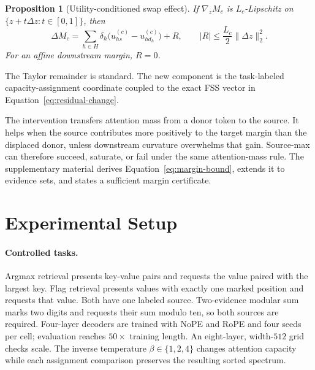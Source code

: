 \documentclass{article}
\newtheorem{proposition}{Proposition}
\begin{document}
\begin{proposition}[Utility-conditioned swap effect]
If $\nabla_z M_c$ is $L_c$-Lipschitz on $\{z+t\Delta z:t\in[0,1]\}$, then
\begin{equation}
 \Delta M_c=
 \sum_{h\in H}\delta_h\big(u_{hs}^{(c)}-u_{hd_h}^{(c)}\big)+R,
 \qquad |R|\le\frac{L_c}{2}\lVert\Delta z\rVert_2^2.
\label{eq:margin-bound}
\end{equation}
For an affine downstream margin, $R=0$.
\label{prop:utility}
\end{proposition}

The Taylor remainder is standard. The new component is the task-labeled capacity-assignment coordinate coupled
to the exact FSS vector in Equation~\ref{eq:residual-change}.

The intervention transfers attention mass from a donor token to the source. It helps when the source
contributes more positively to the target margin than the displaced donor, unless downstream curvature
overwhelms that gain. Source-max can therefore succeed, saturate, or fail under the same attention-mass rule.
The supplementary material derives Equation~\ref{eq:margin-bound}, extends it to evidence sets, and states a sufficient
margin certificate.

\section{Experimental Setup}

\paragraph{Controlled tasks.}
Argmax retrieval presents key-value pairs and requests the value paired with the largest key. Flag retrieval
presents values with exactly one marked position and requests that value. Both have one labeled source.
Two-evidence modular sum marks two digits and requests their sum modulo ten, so both sources are required.
Four-layer decoders are trained with NoPE and RoPE and four seeds per cell; evaluation reaches $50\times$
training length. An eight-layer, width-$512$ grid checks scale. The inverse temperature $\beta\in\{1,2,4\}$
changes attention capacity while each assignment comparison preserves the resulting sorted spectrum.
\end{document}

